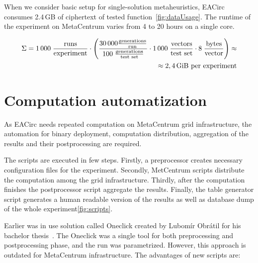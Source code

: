 \documentclass[
  print, %
  Table,   %
  nolof,     %
  nolot,     %
  11pt, %
  oneside  %
]{fithesis3}
\begin{document}
When we consider basic setup for single-solution metaheuristics, EACirc consumes 2.4\,GB of ciphertext of tested function~\cref{fig:dataUsage}. The runtime of the experiment on MetaCentrum varies from 4 to 20 hours on a single core.

\begin{figure*}[t]
    \begin{equation*}
        \begin{aligned}
    \Sigma = 1\,000 \;
             \frac{\textnormal{runs}}
                  {\textnormal{experiment}}
             \cdot
             \left(
             \frac{30\,000 \frac{\textnormal{generations}}{\textnormal{run}}}
                  {100 \; \frac{\textnormal{generations}}{\textnormal{test set}}}
             \cdot
             1\,000 \;
             \frac{\textnormal{vectors}}
                  {\textnormal{test set}}
             \cdot
             8 \;
             \frac{\textnormal{bytes}}
                  {\textnormal{vector}}
             \right) \approx\\
             \approx 2,4 \textnormal{\,GiB per experiment}
        \end{aligned}
    \end{equation*}
    \caption{The amount of data analyzed by EACirc for a single configuration of randomness testing experiment.}
    \label{fig:dataUsage}
\end{figure*}


\section{Computation automatization}

As EACirc needs repeated computation on MetaCentrum grid infrastructure, the automation for binary deployment, computation distribution, aggregation of the results and their postprocessing are required.

The scripts are executed in few steps. Firstly, a preprocessor creates necessary configuration files for the experiment. Secondly, MetCentrum scripts distribute the computation among the grid infrastructure. Thirdly, after the computation finishes the postprocessor script aggregate the results. Finally, the table generator script generates a human readable version of the results as well as database dump of the whole experiment\cref{fig:scripts}.

Earlier was in use solution called Oneclick created by Lubomír Obrátil for his bachelor thesis~\cite{obratilBcThesis}. The Oneclick was a single tool for both preprocessing and postprocessing phase, and the run was parametrized. However, this approach is outdated for MetaCentrum infrastructure. The advantages of new scripts are: 
\end{document}
